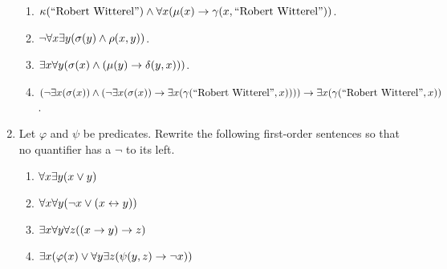 \begin{enumerate}
\begin{enumerate}
            \item
                \(
                    \kappa(\text{``Robert Witterel''}) \meet
                    \forall x \pn*{\mu(x) \rightarrow \gamma(x, \text{``Robert Witterel''})}
                \).
            \item
                \(\neg \forall x \exists y \pn*{\sigma(y) \meet \rho(x, y)}\).
            \item
                \(\exists x \forall y \pn*{\sigma(x) \meet (\mu(y) \rightarrow \delta(y, x))}\).
            \item
                \(
                    \pn*{\neg \exists x \pn*{\sigma(x)}
                          \meet \pn*{\neg \exists x \pn*{\sigma(x)}
                          \rightarrow \exists x \pn*{\gamma(\text{``Robert Witterel''}, x)}}}
                    \rightarrow \exists x \pn*{\gamma(\text{``Robert Witterel''}, x)}
                \).
        \end{enumerate}
    \item
        Let \(\varphi\) and \(\psi\) be predicates.
        Rewrite the following first-order sentences so that no quantifier has a \(\neg\) to its left.
        \begin{enumerate}
            \item
                \(\forall x \exists y (x \vee y)\)
            \item
                \(\forall x \forall y (\neg x \vee (x \leftrightarrow y))\)
            \item
                \(\exists x \forall y \forall z \pn*{\pn*{x \rightarrow y} \rightarrow z}\)
            \item
                \(\exists x \pn*{\varphi(x) \join \forall y \exists z \pn*{\psi(y, z) \rightarrow \neg x}}\)
        \end{enumerate}
\end{enumerate}

